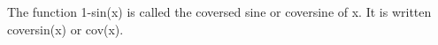The function 1-sin(x) is called the coversed sine
or coversine of x. It is written coversin(x) or cov(x).